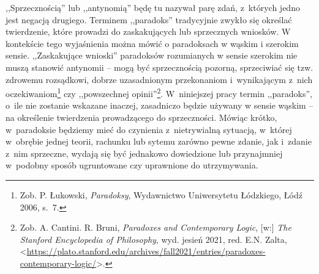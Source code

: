 ,,Sprzecznością'' lub ,,antynomią'' będę tu nazywał parę zdań, z~których jedno jest negacją drugiego.
Terminem ,,paradoks'' tradycyjnie zwykło się określać twierdzenie, które prowadzi do zaskakujących lub sprzecznych wniosków.
W kontekście tego wyjaśnienia można mówić o paradoksach w wąskim i szerokim sensie.
,,Zaskakujące wnioski'' paradoksów rozumianych w sensie szerokim nie muszą stanowić antynomii -- mogą być sprzecznością pozorną,
sprzeciwiać się tzw. zdrowemu rozsądkowi,
dobrze uzasadnionym przekonaniom i~wynikającym z~nich oczekiwaniom\footnote{Zob. P. Łukowski, \textit{Paradoksy}, Wydawnictwo Uniwersytetu Łódzkiego, Łódź 2006, s.~7.}
czy ,,powszechnej opinii''\footnote{Zob. A. Cantini. R. Bruni, \textit{Paradoxes and Contemporary Logic}, [w:] \textit{The Stanford Encyclopedia of Philosophy}, wyd. jesień 2021, red. E.N. Zalta, {\textless}\url{https://plato.stanford.edu/archives/fall2021/entries/paradoxes-contemporary-logic/}{\textgreater}.}.
W~niniejszej pracy termin ,,paradoks'', o~ile nie zostanie wskazane inaczej, zasadniczo będzie używany w sensie wąskim -- na określenie twierdzenia prowadzącego do sprzeczności.
Mówiąc krótko, w~paradoksie będziemy mieć do czynienia z~nietrywialną sytuacją, w~której w~obrębie jednej teorii, rachunku lub sytemu zarówno pewne zdanie, jak i~zdanie z~nim sprzeczne, wydają się być jednakowo dowiedzione lub przynajmniej w~podobny sposób ugruntowane czy uprawnione do utrzymywania.

